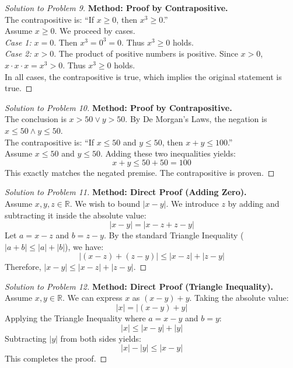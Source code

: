 \documentclass[11pt]{article}
\begin{document}
\begin{proof}[Solution to Problem 9]
    \textbf{Method: Proof by Contrapositive.} \\
    The contrapositive is: ``If $x \ge 0$, then $x^3 \ge 0$.'' \\
    Assume $x \ge 0$. We proceed by cases. \\
    \textit{Case 1:} $x = 0$. Then $x^3 = 0^3 = 0$. Thus $x^3 \ge 0$ holds. \\
    \textit{Case 2:} $x > 0$. The product of positive numbers is positive. Since $x > 0$, $x \cdot x \cdot x = x^3 > 0$. Thus $x^3 \ge 0$ holds. \\
    In all cases, the contrapositive is true, which implies the original statement is true.
\end{proof}

\begin{proof}[Solution to Problem 10]
    \textbf{Method: Proof by Contrapositive.} \\
    The conclusion is $x > 50 \lor y > 50$. By De Morgan's Laws, the negation is $x \le 50 \land y \le 50$. \\
    The contrapositive is: ``If $x \le 50$ and $y \le 50$, then $x + y \le 100$.'' \\
    Assume $x \le 50$ and $y \le 50$. Adding these two inequalities yields:
    \[ x + y \le 50 + 50 = 100 \]
    This exactly matches the negated premise. The contrapositive is proven.
\end{proof}

\begin{proof}[Solution to Problem 11]
    \textbf{Method: Direct Proof (Adding Zero).} \\
    Assume $x, y, z \in \mathbb{R}$. We wish to bound $|x - y|$. We introduce $z$ by adding and subtracting it inside the absolute value:
    \[ |x - y| = |x - z + z - y| \]
    Let $a = x - z$ and $b = z - y$. By the standard Triangle Inequality ($|a + b| \le |a| + |b|$), we have:
    \[ |(x - z) + (z - y)| \le |x - z| + |z - y| \]
    Therefore, $|x - y| \le |x - z| + |z - y|$.
\end{proof}

\begin{proof}[Solution to Problem 12]
    \textbf{Method: Direct Proof (Triangle Inequality).} \\
    Assume $x, y \in \mathbb{R}$. We can express $x$ as $(x - y) + y$. Taking the absolute value:
    \[ |x| = |(x - y) + y| \]
    Applying the Triangle Inequality where $a = x - y$ and $b = y$:
    \[ |x| \le |x - y| + |y| \]
    Subtracting $|y|$ from both sides yields:
    \[ |x| - |y| \le |x - y| \]
    This completes the proof.
\end{proof}
\end{document}
